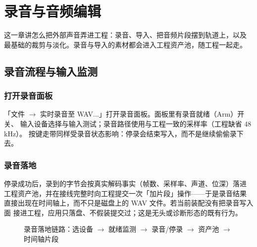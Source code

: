 
\chapter{录音与音频编辑}
\label{ch:recording-audio}






这一章讲怎么把外部声音弄进工程：录音、导入、把音频片段摆到轨道上，以及
最基础的裁剪与淡化。录音与导入的素材都会进入工程资产池，随工程一起走。

\section{录音流程与输入监测}

\subsection{打开录音面板}

「文件 $\to$ 实时录音至 WAV...」打开录音面板。面板里有录音就绪（Arm）开关、
输入设备选择与输入测试；录音路径使用与工程一致的采样率（工程缺省 48 kHz）。
按键走带同样受录音状态影响：停录会结束写入，而不是继续偷偷录下去。


\subsection{录音落地}

停录成功后，录到的字节会按真实解码事实（帧数、采样率、声道、位深）落进
工程资产池，并在接线完整时向工程提交一次「加片段」操作——于是录音结果
直接出现在时间轴上，而不只是磁盘上的 WAV 文件。若当前装配没有把录音写入面
接进工程，应用只落盘、不假装提交过；这是无头或诊断形态的既有行为。

\begin{figure}[htbp]
\centering
{}
\caption{录音落地链路：选设备 $\to$ 就绪监测 $\to$ 录音/停录 $\to$ 资产池 $\to$ 时间轴片段}
\label{fig:ch05-record-flow}
\end{figure}

